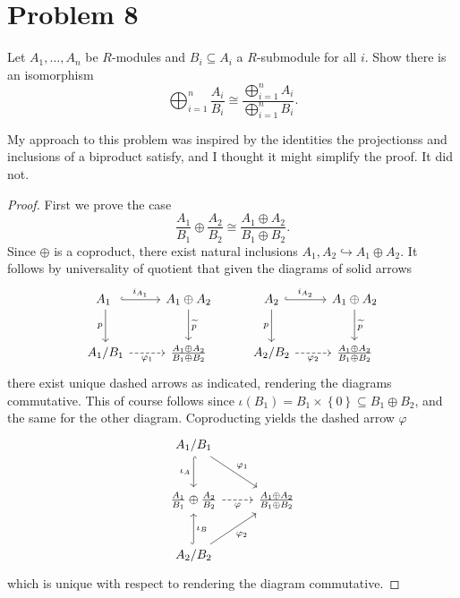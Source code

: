\documentclass[11pt, letterpaper]{article}
\begin{document}
\section{Problem 8}
\begin{problem}\label{8.1}
	Let $A_1, \ldots ,A_n$ be $R$-modules and $B_i \subseteq A_i$ a $R$-submodule for all $i$. Show there is an isomorphism
	\[
		\bigoplus_{i=1} ^n \frac{A_i}{B_i} \cong \frac{\bigoplus_{i=1} ^n A_i}{\bigoplus_{i=1} ^n B_i} 
	.\]
\end{problem}
\begin{remark}
	My approach to this problem was inspired by the identities the projectionss and inclusions of a biproduct satisfy, and I thought it might simplify the proof. It did not.
\end{remark}
\begin{proof}
	First we prove the case
	\[
		\frac{A_1}{B_1} \oplus \frac{A_2}{B_2} \cong \frac{A_1\oplus A_2}{B_1\oplus B_2} 
	.\]
	Since $\oplus $ is a coproduct, there exist natural inclusions $A_1,A_2 \hookrightarrow A_1\oplus A_2$. It follows by universality of quotient that given the diagrams of solid arrows
	\[\begin{tikzcd}[row sep = 2.5em, column sep = 2.5em]
	A_1 \ar[" i_{A_1}  ", hook, r]\ar[" p  "', d] \  & A_1 \oplus A_2 \ar[" \widetilde{p}  ", d]  & A_2 \ar[" i_{A_2}   ", hook, r] \ar[" p "', d]  & A_1 \oplus A_2 \ar[" \widetilde{p}  ", d]  \\
	A_1/B_1 \ar[" \varphi_1 "', dashed, r]  & \frac{A_1 \oplus A_2}{B_1 \oplus B_2}  & A_2/B_2 \ar[" \varphi _2 "', dashed, r]  & \frac{A_1 \oplus A_2}{B_1\oplus B_2} 
	\end{tikzcd}\]
	there exist unique dashed arrows as indicated, rendering the diagrams commutative. This of course follows since $\iota (B_1) = B_1 \times \left\{ 0 \right\} \subseteq B_1 \oplus B_2$, and the same for the other diagram. Coproducting yields the dashed arrow $\varphi $
	\[\begin{tikzcd}[row sep = 2.5em, column sep = 2.5em]
	A_1/B_1 \ar[" \varphi _1 ", dr] \ar[" \iota_A  "', hook, d]  &  \\
	\frac{A_1}{B_1} \oplus \frac{A_2}{B_2} \ar[" \varphi  "', dashed, r]  & \frac{A_1\oplus A_2}{B_1\oplus B_2}  \\
	A_2/B_2 \ar[" \iota_B  "', hook, u] \ar[" \varphi _2 "', ur]  & 
	\end{tikzcd}\]
	which is unique with respect to rendering the diagram commutative.


\end{proof}
\end{document}
